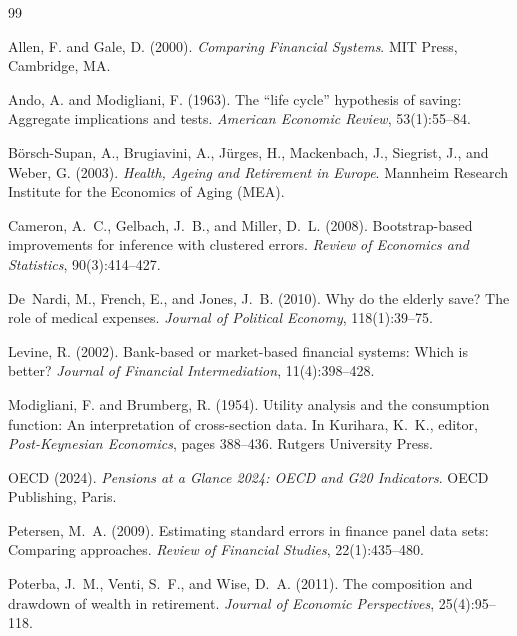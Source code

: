 \documentclass[12pt,a4paper]{article}
\begin{document}
\begin{thebibliography}{99}

Allen, F. and Gale, D. (2000).
\newblock \textit{Comparing Financial Systems}.
\newblock MIT Press, Cambridge, MA.

Ando, A. and Modigliani, F. (1963).
\newblock The ``life cycle'' hypothesis of saving: Aggregate implications and tests.
\newblock \textit{American Economic Review}, 53(1):55--84.

B{\"o}rsch-Supan, A., Brugiavini, A., J{\"u}rges, H., Mackenbach, J., Siegrist, J., and Weber, G. (2003).
\newblock \textit{Health, Ageing and Retirement in Europe}.
\newblock Mannheim Research Institute for the Economics of Aging (MEA).

Cameron, A.~C., Gelbach, J.~B., and Miller, D.~L. (2008).
\newblock Bootstrap-based improvements for inference with clustered errors.
\newblock \textit{Review of Economics and Statistics}, 90(3):414--427.

De~Nardi, M., French, E., and Jones, J.~B. (2010).
\newblock Why do the elderly save? {T}he role of medical expenses.
\newblock \textit{Journal of Political Economy}, 118(1):39--75.

Levine, R. (2002).
\newblock Bank-based or market-based financial systems: {W}hich is better?
\newblock \textit{Journal of Financial Intermediation}, 11(4):398--428.

Modigliani, F. and Brumberg, R. (1954).
\newblock Utility analysis and the consumption function: An interpretation of cross-section data.
\newblock In Kurihara, K.~K., editor, \textit{Post-Keynesian Economics}, pages 388--436. Rutgers University Press.

OECD (2024).
\newblock \textit{Pensions at a Glance 2024: OECD and G20 Indicators}.
\newblock OECD Publishing, Paris.

Petersen, M.~A. (2009).
\newblock Estimating standard errors in finance panel data sets: {C}omparing approaches.
\newblock \textit{Review of Financial Studies}, 22(1):435--480.

Poterba, J.~M., Venti, S.~F., and Wise, D.~A. (2011).
\newblock The composition and drawdown of wealth in retirement.
\newblock \textit{Journal of Economic Perspectives}, 25(4):95--118.

\end{thebibliography}
\end{document}
